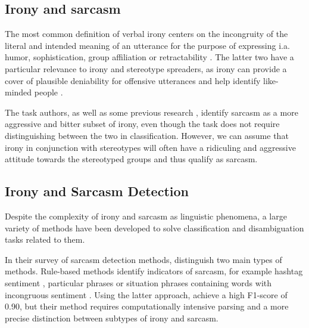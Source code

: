 
\subsection{Irony and sarcasm}
The most common definition of verbal irony centers on the incongruity of the literal and intended meaning of an utterance \cite{reyes2012humor, attardo2000irony} for the purpose of expressing i.a. humor, sophistication, group affiliation or retractability \cite{attardo2000irony}. The latter two have a particular relevance to irony and stereotype spreaders, as irony can provide a cover of plausible deniability for offensive utterances and help identify like-minded people \cite{greene2019deplorable}.

The task authors, as well as some previous research \cite{sarcasm_detection}, identify sarcasm as a more aggressive and bitter subset of irony, even though the task does not require distinguishing between the two in classification. However, we can assume that irony in conjunction with stereotypes will often have a ridiculing and aggressive attitude towards the stereotyped groups and thus qualify as sarcasm. 


\subsection{Irony and Sarcasm Detection}

Despite the complexity of irony and sarcasm as linguistic phenomena, a large variety of methods have been developed to solve classification and disambiguation tasks related to them. 

In their survey of sarcasm detection methods,  distinguish two main types of methods. Rule-based methods identify indicators of sarcasm, for example hashtag sentiment \cite{maynard2014hashtag}, particular phrases \cite{Pathways_punct} or situation phrases containing words with incongruous sentiment \cite{sarcasm_detection}. Using the latter approach,  achieve a high F1-score of 0.90, but their method requires computationally intensive parsing and a more precise distinction between subtypes of irony and sarcasm.

